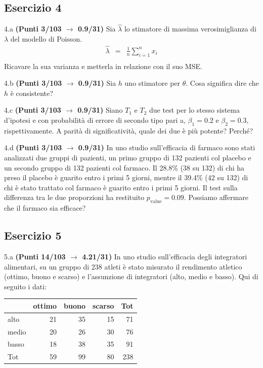 \documentclass[
  11pt,
]{book}
\theoremstyle{mytheoremstyle}
\theoremstyle{mydefstyle}
\begin{document}
\subsection{Esercizio 4}\label{esercizio-4-22}

4.a \textbf{(Punti 3/103 \(\rightarrow\) 0.9/31)} Sia \(\hat \lambda\) lo stimatore di massima verosimiglianza di \(\lambda\) del modello di Poisson.
\begin{eqnarray*}
  \hat\lambda &=&  \frac 1n\sum_{i=1}^nx_i\\
\end{eqnarray*}
Ricavare la sua varianza e metterla in relazione con il suo MSE.

4.b \textbf{(Punti 3/103 \(\rightarrow\) 0.9/31)} Sia \(h\) uno stimatore per \(\theta\). Cosa significa dire che \(h\) è consistente?

4.c \textbf{(Punti 3/103 \(\rightarrow\) 0.9/31)} Siano \(T_1\) e \(T_2\) due test per lo stesso sistema d'ipotesi e con probabilità di errore di secondo tipo pari a, \(\beta_1=0.2\) e \(\beta_2=0.3\), rispettivamente. A parità di significatività, quale dei due è più potente? Perché?

4.d \textbf{(Punti 3/103 \(\rightarrow\) 0.9/31)} In uno studio sull'efficacia di farmaco sono stati analizzati due gruppi di pazienti, un primo gruppo di 132 pazienti col placebo e un secondo gruppo di 132 pazienti col farmaco. Il 28.8\% (38 su 132) di chi ha preso il placebo è guarito entro i primi 5 giorni, mentre il 39.4\% (42 su 132) di chi è stato trattato col farmaco è guarito entro i primi 5 giorni. Il test sulla differenza tra le due proporzioni ha restituito \(p_\text{value}=0.09\). Possiamo affermare che il farmaco sia efficace?

\subsection{Esercizio 5}\label{esercizio-5-20}

5.a \textbf{(Punti 14/103 \(\rightarrow\) 4.21/31)} In uno studio sull'efficacia degli integratori alimentari, su un gruppo di 238 atleti è stato misurato il rendimento atletico (ottimo, buono e scarso) e l'assunzione di integratori (alto, medio e basso). Qui di seguito i dati:

\begin{table}[H]
\centering
\begin{tabular}{lrrrr}
\toprule
  & ottimo & buono & scarso & Tot\\
\midrule
alto & 21 & 35 & 15 & 71\\
medio & 20 & 26 & 30 & 76\\
basso & 18 & 38 & 35 & 91\\
Tot & 59 & 99 & 80 & 238\\
\bottomrule
\end{tabular}
\end{table}
\end{document}
